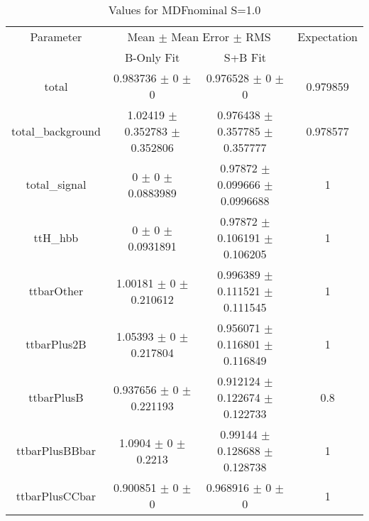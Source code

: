\begin{table}
\centering
\caption{Values for MDFnominal S=1.0}
\begin{tabular}{cccc}
\toprule
Parameter & \multicolumn{2}{c}{Mean $\pm$ Mean Error $\pm$ RMS} & Expectation\\
 & B-Only Fit & S+B Fit & \\
\midrule
total & \num{0.983736} $\pm$ \num{0} $\pm$ \num{0} & \num{0.976528} $\pm$ \num{0} $\pm$ \num{0} & \num{0.979859}\\
total\_background & \num{1.02419} $\pm$ \num{0.352783} $\pm$ \num{0.352806} & \num{0.976438} $\pm$ \num{0.357785} $\pm$ \num{0.357777} & \num{0.978577}\\
total\_signal & \num{0} $\pm$ \num{0} $\pm$ \num{0.0883989} & \num{0.97872} $\pm$ \num{0.099666} $\pm$ \num{0.0996688} & \num{1}\\
ttH\_hbb & \num{0} $\pm$ \num{0} $\pm$ \num{0.0931891} & \num{0.97872} $\pm$ \num{0.106191} $\pm$ \num{0.106205} & \num{1}\\
ttbarOther & \num{1.00181} $\pm$ \num{0} $\pm$ \num{0.210612} & \num{0.996389} $\pm$ \num{0.111521} $\pm$ \num{0.111545} & \num{1}\\
ttbarPlus2B & \num{1.05393} $\pm$ \num{0} $\pm$ \num{0.217804} & \num{0.956071} $\pm$ \num{0.116801} $\pm$ \num{0.116849} & \num{1}\\
ttbarPlusB & \num{0.937656} $\pm$ \num{0} $\pm$ \num{0.221193} & \num{0.912124} $\pm$ \num{0.122674} $\pm$ \num{0.122733} & \num{0.8}\\
ttbarPlusBBbar & \num{1.0904} $\pm$ \num{0} $\pm$ \num{0.2213} & \num{0.99144} $\pm$ \num{0.128688} $\pm$ \num{0.128738} & \num{1}\\
ttbarPlusCCbar & \num{0.900851} $\pm$ \num{0} $\pm$ \num{0} & \num{0.968916} $\pm$ \num{0} $\pm$ \num{0} & \num{1}\\
\bottomrule
\end{tabular}
\end{table}